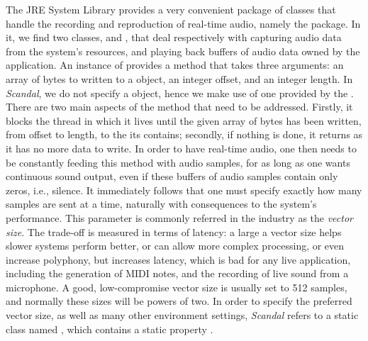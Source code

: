 The JRE System Library provides a very convenient package of classes that handle the recording and reproduction of real-time audio, namely the  package. In it, we find two classes,  and , that deal respectively with capturing audio data from the system's resources, and playing back buffers of audio data owned by the application. An instance of  provides a  method that takes three arguments: an array of bytes to written to a  object, an integer offset, and an integer length. In \emph{Scandal}, we do not specify a  object, hence we make use of one provided by the . There are two main aspects of the  method that need to be addressed. Firstly, it blocks the thread in which it lives until the given array of bytes has been written, from offset to length, to the  its  contains; secondly, if nothing is done, it returns as it has no more data to write. In order to have real-time audio, one then needs to be constantly feeding this  method with audio samples, for as long as one wants continuous sound output, even if these buffers of audio samples contain only zeros, i.e., silence. It immediately follows that one must specify exactly how many samples are sent at a time, naturally with consequences to the system's performance. This parameter is commonly referred in the industry as the \emph{vector size}. The trade-off is measured in terms of latency: a large a vector size helps slower systems perform better, or can allow more complex processing, or even increase polyphony, but increases latency, which is bad for any live application, including the generation of MIDI notes, and the recording of live sound from a microphone. A good, low-compromise vector size is usually set to 512 samples, and normally these sizes will be powers of two. In order to specify the preferred vector size, as well as many other environment settings, \emph{Scandal} refers to a static class named , which contains a static property .

